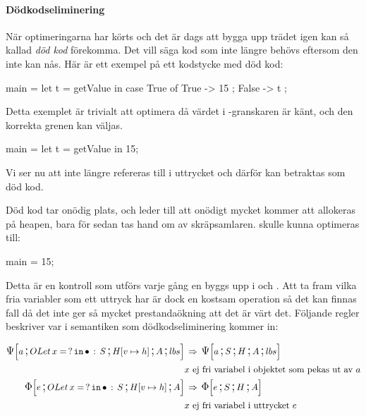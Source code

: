 \documentclass[../Optimise]{subfiles}
\begin{document}
\paragraph{Dödkodseliminering}

\label{sec:DeadCode}

När optimeringarna har körts och det är dags att bygga upp trädet igen kan
så kallad \emph{död kod} förekomma. Det vill säga kod som inte längre 
behövs eftersom den inte kan nås. Här är ett exempel på ett kodstycke med
död kod:

\begin{codeEx}
main = let t = getValue 
       in case True of
              { True  -> 15
              ; False -> t
              };
\end{codeEx}

Detta exemplet är trivialt att optimera då värdet i -granskaren är känt, och 
den korrekta grenen kan väljas.

\begin{codeEx}
main = let t = getValue in 15;
\end{codeEx}


Vi ser nu att  inte längre refereras till i uttrycket  
och därför kan  betraktas som död kod. 

Död kod tar onödig plats, och leder till att onödigt mycket kommer att 
allokeras på heapen, bara för sedan tas hand om av skräpsamlaren.  skulle
kunna optimeras till:

\begin{codeEx}
main = 15;
\end{codeEx}

\begin{comment}
Denna process kan mer formellt skrivas som:

\begin{mathpar}
\inferrule
  {t\,\text{ej fri variabel i}\,e_2}
  {\mathtt{let}\,t\,=\,e_1\,\mathtt{in}\,e_2 \Rightarrow e_2}
\;
\end{mathpar}
\end{comment}

Detta är en kontroll som utförs varje gång en  byggs upp 
i \iIrr  och \iPsi. Att ta fram vilka fria variabler som ett uttryck har är dock en 
kostsam operation så det kan finnas fall då det inte ger så mycket
prestandaökning att det är värt det. Följande regler beskriver
var i semantiken som dödkodseliminering kommer in:

\begin{align*}
\CBNPSI{\cOLet xS}{\heap vh}A{lbs}a & \rulesep \CBNPSI SHA{lbs}a\\
& x \text{ ej fri variabel i objektet som pekas ut av } a \nonumber \\
\CBNIRR{\cOLet xS}{\heap vh}Ae & \rulesep \CBNIRR SHAe\\
& x \text{ ej fri variabel i uttrycket } e \nonumber
\end{align*}
\end{document}
